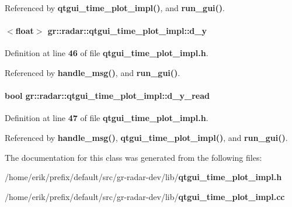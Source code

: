 Referenced by {\bf qtgui\+\_\+time\+\_\+plot\+\_\+impl()}, and {\bf run\+\_\+gui()}.

\paragraph[{d\+\_\+y}]{$<$float$>$ gr\+::radar\+::qtgui\+\_\+time\+\_\+plot\+\_\+impl\+::d\+\_\+y}\label{classgr_1_1radar_1_1qtgui__time__plot__impl_acfc2dd06ef92c924eb87d4a2a78574ed}


Definition at line {\bf 46} of file {\bf qtgui\+\_\+time\+\_\+plot\+\_\+impl.\+h}.



Referenced by {\bf handle\+\_\+msg()}, and {\bf run\+\_\+gui()}.

\paragraph[{d\+\_\+y\+\_\+read}]{\setlength{\rightskip}{0pt plus 5cm}bool gr\+::radar\+::qtgui\+\_\+time\+\_\+plot\+\_\+impl\+::d\+\_\+y\+\_\+read}\label{classgr_1_1radar_1_1qtgui__time__plot__impl_af0398636714a2f99428ad500fb52f0f5}


Definition at line {\bf 47} of file {\bf qtgui\+\_\+time\+\_\+plot\+\_\+impl.\+h}.



Referenced by {\bf handle\+\_\+msg()}, {\bf qtgui\+\_\+time\+\_\+plot\+\_\+impl()}, and {\bf run\+\_\+gui()}.



The documentation for this class was generated from the following files\+:\begin{DoxyCompactItemize}
\item 
/home/erik/prefix/default/src/gr-\/radar-\/dev/lib/{\bf qtgui\+\_\+time\+\_\+plot\+\_\+impl.\+h}\item 
/home/erik/prefix/default/src/gr-\/radar-\/dev/lib/{\bf qtgui\+\_\+time\+\_\+plot\+\_\+impl.\+cc}\end{DoxyCompactItemize}

